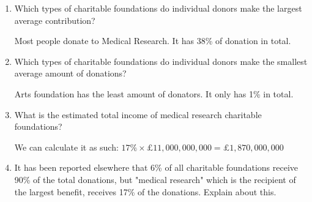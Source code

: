 \documentclass[12pt,titlepage]{article}
\begin{document}
\begin{itemize}
{        \begin{enumerate}[label=\Alph*.]
            \item {
                Which types of charitable foundations do individual donors make the largest average contribution?

                Most people donate to Medical Research. It has 38\% of donation in total.
            }
            \item {
                Which types of charitable foundations do individual donors make the smallest average amount of donations?

                Arts foundation has the least amount of donators. It only has 1\% in total.
            }
            \item {
                What is the estimated total income of medical research charitable foundations?

                We can calculate it as such: $17\%\times\pounds11,000,000,000=\pounds1,870,000,000$
            }
            \item {
                It has been reported elsewhere that 6\% of all charitable foundations receive 90\% of the total
                donations, but "medical research" which is the recipient of the largest benefit, receives 17\% of the
                donations. Explain about this.

                
            }
        \end{enumerate}
    }
\end{itemize}
\end{document}
